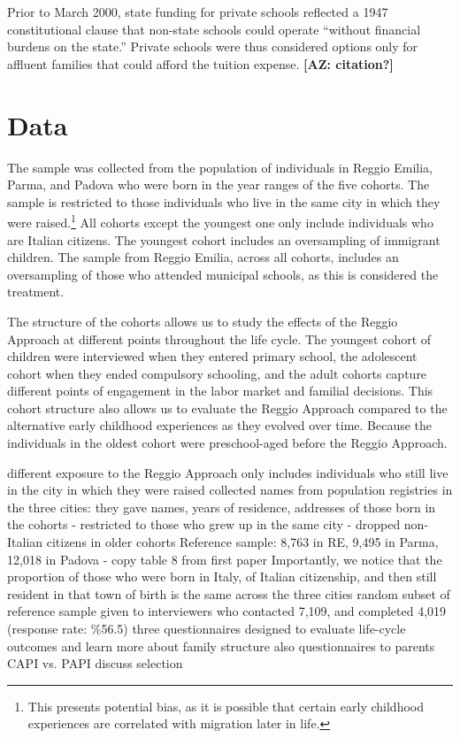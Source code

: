 Prior to March 2000, state funding for private schools reflected a 1947 constitutional clause that non-state schools could operate ``without financial burdens on the state.'' Private schools were thus considered options only for affluent families that could afford the tuition expense. \textbf{[AZ: citation?]}

\section{Data}
\label{sec:data}


The sample was collected from the population of individuals in Reggio Emilia, Parma, and Padova who were born in the year ranges of the five cohorts. The sample is restricted to those individuals who live in the same city in which they were raised.\footnote{This presents potential bias, as it is possible that certain early childhood experiences are correlated with migration later in life.} All cohorts except the youngest one only include individuals who are Italian citizens. The youngest cohort includes an oversampling of immigrant children. The sample from Reggio Emilia, across all cohorts, includes an oversampling of those who attended municipal schools, as this is considered the treatment.

The structure of the cohorts allows us to study the effects of the Reggio Approach at different points throughout the life cycle. The youngest cohort of children were interviewed when they entered primary school, the adolescent cohort when they ended compulsory schooling, and the adult cohorts capture different points of engagement in the labor market and familial decisions. This cohort structure also allows us to evaluate the Reggio Approach compared to the alternative early childhood experiences as they evolved over time. Because the individuals in the oldest cohort were preschool-aged before the Reggio Approach.

different exposure to the Reggio Approach
only includes individuals who still live in the city in which they were raised
collected names from population registries in the three cities: they gave names, years of residence, addresses of those born in the cohorts
- restricted to those who grew up in the same city
- dropped non-Italian citizens in older cohorts
Reference sample: 8,763 in RE, 9,495 in Parma, 12,018 in Padova
- copy table 8 from first paper
Importantly, we notice that the proportion of those who were born in Italy, of Italian citizenship,
and then still resident in that town of birth is the same across the three cities
random subset of reference sample given to interviewers who contacted 7,109, and completed 4,019 (response rate: \%56.5)
three questionnaires designed to evaluate life-cycle outcomes and learn more about family structure
also questionnaires to parents
CAPI vs. PAPI
discuss selection



